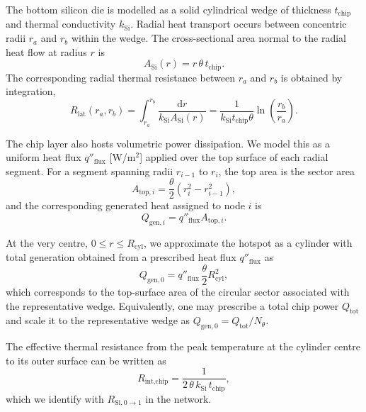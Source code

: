 \documentclass[conference]{IEEEtran}
\begin{document}
The bottom silicon die is modelled as a solid cylindrical wedge of thickness $t_{\text{chip}}$ and thermal conductivity $k_{\text{Si}}$. Radial heat transport occurs between concentric radii $r_a$ and $r_b$ within the wedge. The cross-sectional area normal to the radial heat flow at radius $r$ is
\begin{equation}
	A_{\text{Si}}(r) = r \, \theta \, t_{\text{chip}}.
\end{equation}
The corresponding radial thermal resistance between $r_a$ and $r_b$ is obtained by integration,
\begin{equation}
	R_{\text{lat}}(r_a,r_b) = \int_{r_a}^{r_b} \frac{\mathrm{d}r}{k_{\text{Si}} A_{\text{Si}}(r)}
	= \frac{1}{k_{\text{Si}} t_{\text{chip}} \theta} \ln\!\left( \frac{r_b}{r_a} \right).
	\label{eq:R_lat_chip}
\end{equation}

The chip layer also hosts volumetric power dissipation. We model this as a uniform heat flux $q''_{\text{flux}}$ [W/m$^2$] applied over the top surface of each radial segment. For a segment spanning radii $r_{i-1}$ to $r_i$, the top area is the sector area
\begin{equation}
	A_{\text{top},i} = \frac{\theta}{2} (r_i^2 - r_{i-1}^2),
	\label{eq:Atop_i}
\end{equation}
and the corresponding generated heat assigned to node $i$ is
\begin{equation}
	Q_{\text{gen},i} = q''_{\text{flux}} A_{\text{top},i}.
	\label{eq:Qgen_i}
\end{equation}

At the very centre, $0 \le r \le R_{\text{cyl}}$, we approximate the hotspot as a cylinder with total generation obtained from a prescribed heat flux $q''_{\text{flux}}$ as
\begin{equation}
	 Q_{\text{gen},0} = q''_{\text{flux}} \, \frac{\theta}{2} R_{\text{cyl}}^2,
	\label{eq:Qgen0}
\end{equation}
which corresponds to the top-surface area of the circular sector associated with the representative wedge. Equivalently, one may prescribe a total chip power $Q_{\text{tot}}$ and scale it to the representative wedge as $Q_{\text{gen},0} = Q_{\text{tot}}/N_\theta$.

The effective thermal resistance from the peak temperature at the cylinder centre to its outer surface can be written as
\begin{equation}
	R_{\text{int,chip}} = \frac{1}{2 \, \theta \, k_{\text{Si}} \, t_{\text{chip}}},
	\label{eq:R_int_chip}
\end{equation}
which we identify with $R_{\text{Si},0\to 1}$ in the network.
\end{document}
